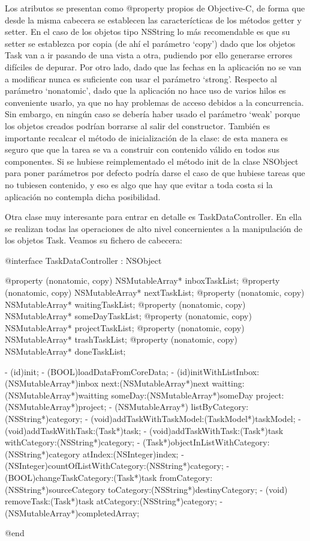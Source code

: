 \documentclass[parskip=half*]{scrartcl}
\begin{document}
Los atributos se presentan como @property propios de Objective-C, de forma que desde la misma cabecera se establecen las caracter\'icticas de los m\'etodos getter y setter. En el caso de los objetos tipo NSString lo m\'as recomendable es que su setter se establezca por copia (de ah\'i el par\'ametro `copy') dado que los objetos Task van a ir pasando de una vista a otra, pudiendo por ello generarse errores dif\'iciles de depurar. Por otro lado, dado que las fechas en la aplicaci\'on no se van a modificar nunca es suficiente con usar el par\'ametro `strong'. Respecto al par\'ametro `nonatomic', dado que la aplicaci\'on no hace uso de varios hilos es conveniente usarlo, ya que no hay problemas de acceso debidos a la concurrencia. Sin embargo, en ning\'un caso se deber\'ia haber usado el par\'ametro `weak' porque los objetos creados podr\'ian borrarse al salir del constructor. Tambi\'en es importante recalcar el m\'etodo de inicializaci\'on de la clase: de esta manera es seguro que que la tarea se va a  construir con contenido v\'alido en todos sus componentes. Si se hubiese reimplementado el m\'etodo init de la clase NSObject para poner par\'ametros por defecto podr\'ia darse el caso de que hubiese tareas que no tubiesen contenido, y eso es algo que hay que evitar a toda costa si la aplicaci\'on no contempla dicha posibilidad.

Otra clase muy interesante para entrar en detalle es TaskDataController. En ella se realizan todas las operaciones de alto nivel concernientes a la manipulaci\'on de los objetos Task. Veamos su fichero de cabecera:

\begin{verbatimtab}
@interface TaskDataController : NSObject

@property (nonatomic, copy) NSMutableArray* inboxTaskList;
@property (nonatomic, copy) NSMutableArray* nextTaskList;
@property (nonatomic, copy) NSMutableArray* waitingTaskList;
@property (nonatomic, copy) NSMutableArray* someDayTaskList;
@property (nonatomic, copy) NSMutableArray* projectTaskList;
@property (nonatomic, copy) NSMutableArray* trashTaskList;
@property (nonatomic, copy) NSMutableArray* doneTaskList;


- (id)init;
- (BOOL)loadDataFromCoreData;
- (id)initWithListInbox:(NSMutableArray*)inbox next:(NSMutableArray*)next waitting:(NSMutableArray*)waitting someDay:(NSMutableArray*)someDay project:(NSMutableArray*)project;
- (NSMutableArray*) listByCategory:(NSString*)category;
- (void)addTaskWithTaskModel:(TaskModel*)taskModel;
- (void)addTaskWithTask:(Task*)task;
- (void)addTaskWithTask:(Task*)task withCategory:(NSString*)category;
- (Task*)objectInListWithCategory:(NSString*)category atIndex:(NSInteger)index;
- (NSInteger)countOfListWithCategory:(NSString*)category;
- (BOOL)changeTaskCategory:(Task*)task 
fromCategory:(NSString*)sourceCategory toCategory:(NSString*)destinyCategory;
- (void) removeTask:(Task*)task atCategory:(NSString*)category;
- (NSMutableArray*)completedArray;

@end
\end{verbatimtab}
\end{document}
